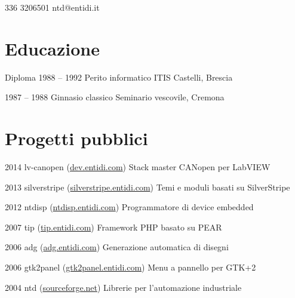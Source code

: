 \documentclass[fontsize=10pt]{tccv}
\begin{document}
    {336 3206501}
    {ntd@entidi.it}

\section{Educazione}

\begin{yearlist}

\item[Diploma]{1988 -- 1992}
     {Perito informatico}
     {ITIS Castelli, Brescia}

\item{1987 -- 1988}
     {Ginnasio classico}
     {Seminario vescovile, Cremona}

\end{yearlist}

\section{Progetti pubblici}

\begin{yearlist}

\item{2014}
     {lv-canopen (\href{http://dev.entidi.com/p/lv-canopen}{dev.entidi.com})}
     {Stack master CANopen per LabVIEW}

\item{2013}
     {silverstripe (\href{http://silverstripe.entidi.com/}{silverstripe.entidi.com})}
     {Temi e moduli basati su SilverStripe}

\item{2012}
     {ntdisp (\href{http://ntdisp.entidi.com/}{ntdisp.entidi.com})}
     {Programmatore di device embedded}

\item{2007}
     {tip (\href{http://tip.entidi.com/}{tip.entidi.com})}
     {Framework PHP basato su PEAR}

\item{2006}
     {adg (\href{http://adg.entidi.com/}{adg.entidi.com})}
     {Generazione automatica di disegni}

\item{2006}
     {gtk2panel (\href{http://gtk2panel.entidi.com/}{gtk2panel.entidi.com})}
     {Menu a pannello per GTK+2}

\item{2004}
     {ntd (\href{https://sourceforge.net/projects/ntd/}{sourceforge.net})}
     {Librerie per l'automazione industriale}

\end{yearlist}
\end{document}
